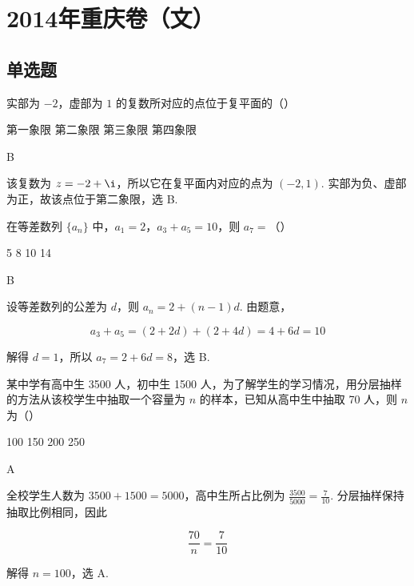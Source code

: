 \chapter{2014年重庆卷（文）}

\section{单选题}

\begin{problem}
实部为 \(-2\)，虚部为 \(1\) 的复数所对应的点位于复平面的（\quad）

\choices
    {第一象限}
    {第二象限}
    {第三象限}
    {第四象限}
\end{problem}

\begin{answer}
B
\end{answer}

\begin{solution}
该复数为 \(z=-2+\i\)，所以它在复平面内对应的点为 \((-2,1)\). 实部为负、虚部为正，故该点位于第二象限，选 B.
\end{solution}

\begin{problem}
在等差数列 \(\{a_{n}\}\) 中，\(a_{1} = 2\)，\(a_{3} + a_{5} = 10\)，则 \(a_{7} =\)（\quad）

\choices
    {5}
    {8}
    {10}
    {14}
\end{problem}

\begin{answer}
B
\end{answer}

\begin{solution}
设等差数列的公差为 \(d\)，则 \(a_n=2+(n-1)d\). 由题意，

\[
a_3+a_5=(2+2d)+(2+4d)=4+6d=10
\]

解得 \(d=1\)，所以 \(a_7=2+6d=8\)，选 B.
\end{solution}

\begin{problem}
某中学有高中生 3500 人，初中生 1500 人，为了解学生的学习情况，用分层抽样的方法从该校学生中抽取一个容量为 \(n\) 的样本，已知从高中生中抽取 70 人，则 \(n\) 为（\quad）

\choices
    {100}
    {150}
    {200}
    {250}
\end{problem}

\begin{answer}
A
\end{answer}

\begin{solution}
全校学生人数为 \(3500+1500=5000\)，高中生所占比例为 \(\frac{3500}{5000}=\frac{7}{10}\). 分层抽样保持抽取比例相同，因此

\[
\frac{70}{n}=\frac{7}{10}
\]

解得 \(n=100\)，选 A.
\end{solution}

